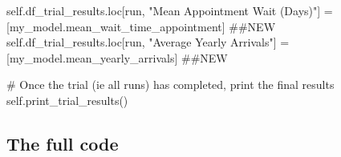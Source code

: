 \documentclass[
  letterpaper,
  DIV=11,
  numbers=noendperiod]{scrreprt}
\newenvironment{Shaded}{\begin{snugshade}}{\end{snugshade}}
\newcommand{\CommentTok}[1]{\textcolor[rgb]{0.37,0.37,0.37}{#1}}
\newcommand{\NormalTok}[1]{\textcolor[rgb]{0.00,0.23,0.31}{#1}}
\newcommand{\OperatorTok}[1]{\textcolor[rgb]{0.37,0.37,0.37}{#1}}
\newcommand{\StringTok}[1]{\textcolor[rgb]{0.13,0.47,0.30}{#1}}
\newcommand{\VariableTok}[1]{\textcolor[rgb]{0.07,0.07,0.07}{#1}}
\begin{document}
\begin{Shaded}
\begin{Highlighting}[]
            \VariableTok{self}\NormalTok{.df\_trial\_results.loc[run, }\StringTok{"Mean Appointment Wait (Days)"}\NormalTok{] }\OperatorTok{=}\NormalTok{ [my\_model.mean\_wait\_time\_appointment] }\CommentTok{\#\#NEW}
            \VariableTok{self}\NormalTok{.df\_trial\_results.loc[run, }\StringTok{"Average Yearly Arrivals"}\NormalTok{] }\OperatorTok{=}\NormalTok{ [my\_model.mean\_yearly\_arrivals] }\CommentTok{\#\#NEW}


        \CommentTok{\# Once the trial (ie all runs) has completed, print the final results}
        \VariableTok{self}\NormalTok{.print\_trial\_results()}
\end{Highlighting}
\end{Shaded}

\subsection{The full code}\label{the-full-code-2}
\end{document}
